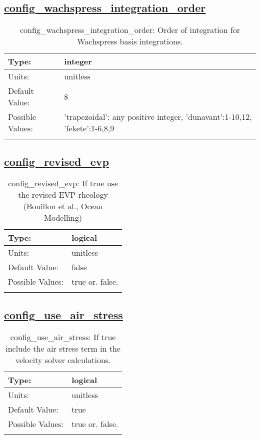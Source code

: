\subsection[config\_wachspress\_integration\_order]{\hyperref[sec:nm_tab_velocity_solver]{config\_wachspress\_integration\_order}}
\label{subsec:nm_sec_config_wachspress_integration_order}
\begin{center}
\begin{longtable}{| p{2.0in} || p{4.0in} |}
    \hline
    Type: & integer \\
    \hline
    Units: & \si{unitless} \\
    \hline
    Default Value: & 8 \\
    \hline
    Possible Values: & 'trapezoidal': any positive integer, 'dunavant':1-10,12, 'fekete':1-6,8,9 \\
    \hline
    \caption{config\_wachspress\_integration\_order: Order of integration for Wachspress basis integrations.}
\end{longtable}
\end{center}
\subsection[config\_revised\_evp]{\hyperref[sec:nm_tab_velocity_solver]{config\_revised\_evp}}
\label{subsec:nm_sec_config_revised_evp}
\begin{center}
\begin{longtable}{| p{2.0in} || p{4.0in} |}
    \hline
    Type: & logical \\
    \hline
    Units: & \si{unitless} \\
    \hline
    Default Value: & false \\
    \hline
    Possible Values: & true or. false. \\
    \hline
    \caption{config\_revised\_evp: If true use the revised EVP rheology (Bouillon et al., Ocean Modelling)}
\end{longtable}
\end{center}
\subsection[config\_use\_air\_stress]{\hyperref[sec:nm_tab_velocity_solver]{config\_use\_air\_stress}}
\label{subsec:nm_sec_config_use_air_stress}
\begin{center}
\begin{longtable}{| p{2.0in} || p{4.0in} |}
    \hline
    Type: & logical \\
    \hline
    Units: & \si{unitless} \\
    \hline
    Default Value: & true \\
    \hline
    Possible Values: & true or. false. \\
    \hline
    \caption{config\_use\_air\_stress: If true include the air stress term in the velocity solver calculations.}
\end{longtable}
\end{center}
